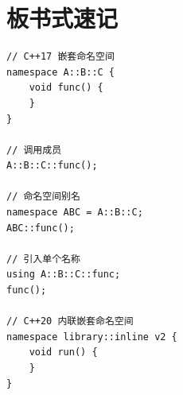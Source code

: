 \documentclass[UTF8,12pt,a4paper]{ctexart}
\begin{document}
\section{板书式速记}

\begin{lstlisting}
// C++17 嵌套命名空间
namespace A::B::C {
    void func() {
    }
}

// 调用成员
A::B::C::func();

// 命名空间别名
namespace ABC = A::B::C;
ABC::func();

// 引入单个名称
using A::B::C::func;
func();

// C++20 内联嵌套命名空间
namespace library::inline v2 {
    void run() {
    }
}
\end{lstlisting}
\end{document}
